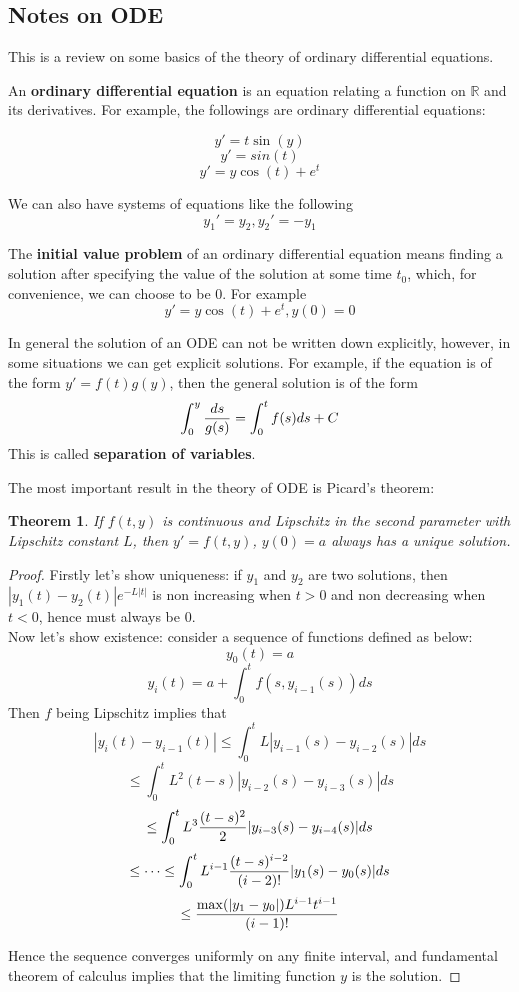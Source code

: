\documentclass[20pt]{article} %
\theoremstyle{break}
\newtheorem{thm}[definition]{Theorem}
\begin{document}
\subsection{Notes on ODE}

This is a review on some basics of the theory of ordinary differential equations.

An {\bf ordinary differential equation} is an equation relating a function on $\mathbb{R}$ and its derivatives. For example, the followings are ordinary differential equations:

\[y'=t\sin(y)\]
\[y'=sin(t)\]
\[y'=y\cos(t)+e^t\]

We can also have systems of equations like the following
\[y_1'=y_2, y_2'=-y_1\]


The {\bf initial value problem} of an ordinary differential equation means finding a solution after specifying the value of the solution at some time $t_0$, which, for convenience, we can choose to be $0$. For example
\[y'=y\cos(t)+e^t, y(0)=0\]

In general the solution of an ODE can not be written down explicitly, however, in some situations we can get explicit solutions. For example, if the equation is of the form $y'=f(t)g(y)$, then the general solution is of the form
\[\int_0^y {ds\over g(s)}=\int_0^t f(s)ds+C\]
This is called {\bf separation of variables}.

The most important result in the theory of ODE is Picard's theorem:

\begin{thm}
If $f(t, y)$ is continuous and Lipschitz in the second parameter with Lipschitz constant $L$, then $y'=f(t, y)$, $y(0)=a$ always has a unique solution.
\end{thm}

\begin{proof}
 Firstly let's show uniqueness: if $y_1$ and $y_2$ are two solutions, then $|y_1(t)-y_2(t)|e^{-L|t|}$ is non increasing when $t>0$ and non decreasing when $t<0$, hence must always be $0$.\\
  
  Now let's show existence: consider a sequence of functions defined as below:
  \[y_0(t)=a\]
  \[y_i(t)=a+\int_0^t f(s, y_{i-1}(s))ds\]
  Then $f$ being Lipschitz implies that
  \[|y_i(t)-y_{i-1}(t)|\leq \int_0^t L|y_{i-1}(s)-y_{i-2}(s)|ds\]
  \[\leq \int_0^t L^2(t-s)|y_{i-2}(s)-y_{i-3}(s)|ds\]
  \[\leq \int_0^t L^3{(t-s)^2\over 2}|y_{i-3}(s)-y_{i-4}(s)|ds\]
  \[\leq \dots \leq \int_0^t L^{i-1}{(t-s)^{i-2}\over (i-2)!}|y_1(s)-y_0(s)|ds\]
  \[\leq {\max(|y_1-y_0|)L^{i-1}t^{i-1}\over (i-1)!}\]

  Hence the sequence converges uniformly on any finite interval, and fundamental theorem of calculus implies that the limiting function $y$ is the solution.
\end{proof}
\end{document}
